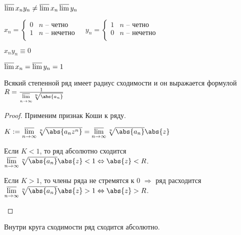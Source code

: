 \begin{remark}\slashns
    
    $\varlimsup x_ny_n \ne \varlimsup x_n \varlimsup y_n$
    
    $x_n = \begin{cases}
    0 & n \text{ -- четно}\\
    1 & n \text{ -- нечетно}\\
    \end{cases} \;\;\;\;y_n = \begin{cases}
    1 & n \text{ -- четно}\\
    0 & n \text{ -- нечетно}\\
    \end{cases}$
    
    $x_ny_n \equiv 0$
    
    $\varlimsup x_n = \varlimsup y_n = 1$
\end{remark}

\begin{theorem}\slashns
    
    Всякий степенной ряд имеет радиус сходимости и он выражается формулой $R = \frac{1}{\varlimsup\limits_{n \to \infty} \sqrt[n]{\abs{a_n}} }$
\end{theorem}

\begin{proof}\slashns
    
    Применим признак Коши к ряду.
    
    $K := \varlimsup\limits_{n \to \infty} \sqrt[n]{\abs{a_nz^n}} = \varlimsup\limits_{n \to \infty} \sqrt[n]{\abs{a_n}} \abs{z}$
    \begin{description} 
        \item 
        Если $K < 1$, то ряд абсолютно сходится $\varlimsup\limits_{n \to \infty} \sqrt[n]{\abs{a_n}} \abs{z} < 1 \Leftrightarrow \abs{z} < R$.
    
        \item 
        Если $K > 1$, то члены ряда не стремятся к 0 $\Rightarrow$ ряд расходится $\varlimsup\limits_{n \to \infty} \sqrt[n]{\abs{a_n}} \abs{z} > 1 \Leftrightarrow \abs{z} > R$.
    \end{description}
\end{proof}

\begin{remark}\slashns
    
    Внутри круга сходимости ряд сходится абсолютно. 
\end{remark}

